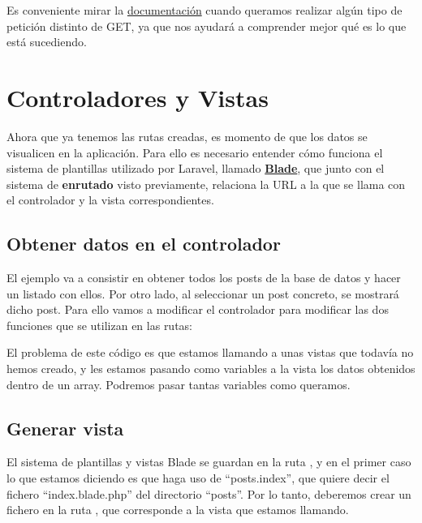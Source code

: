 Es conveniente mirar la \href{https://laravel.com/docs/10.x/routing}{documentación} cuando queramos realizar algún tipo de petición distinto de GET, ya que nos ayudará a comprender mejor qué es lo que está sucediendo.

\chapter{Controladores y Vistas}
Ahora que ya tenemos las rutas creadas, es momento de que los datos se visualicen en la aplicación. Para ello es necesario entender cómo funciona el sistema de plantillas utilizado por Laravel, llamado \textbf{\href{https://laravel.com/docs/10.x/blade}{Blade}}, que junto con el sistema de \textbf{enrutado} visto previamente, relaciona la URL a la que se llama con el controlador y la vista correspondientes.

\section{Obtener datos en el controlador}

El ejemplo va a consistir en obtener todos los posts de la base de datos y hacer un listado con ellos. Por otro lado, al seleccionar un post concreto, se mostrará dicho post. Para ello vamos a modificar el controlador para modificar las dos funciones que se utilizan en las rutas:

\begin{mycode}{Funciones modificadas en el controlador Post}{php}{}
<?php
// ...
use App\Models\Post;
// ...
class PostController extends Controller{
    public function index(){
        $posts = Post::orderBy('created_at')->get();
        return view('posts.index',['posts' => $posts]);
    }
    //...
    public function show(Post $post){
        return view('posts.show',['post'=>$post]);
    }
\end{mycode}

El problema de este código es que estamos llamando a unas vistas que todavía no hemos creado, y les estamos pasando como variables a la vista los datos obtenidos dentro de un array. Podremos pasar tantas variables como queramos.


\section{Generar vista}

El sistema de plantillas y vistas Blade se guardan en la ruta , y en el primer caso lo que estamos diciendo es que haga uso de “posts.index”, que quiere decir el fichero “index.blade.php” del directorio “posts”. Por lo tanto, deberemos crear un fichero en la ruta , que corresponde a la vista que estamos llamando.

